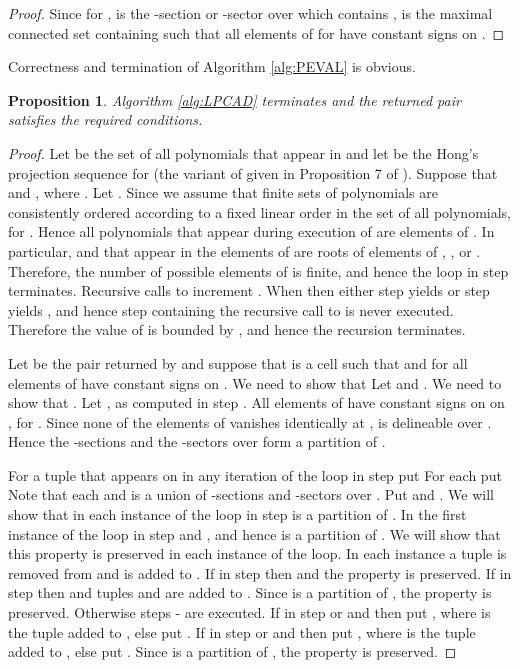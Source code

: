 \documentclass[english]{amsart}
\numberwithin{equation}{section}
\numberwithin{figure}{section}
\newtheorem{prop}[thm]{Proposition}
\begin{document}
\begin{proof}
Since for ,  is the -section or -sector
over  which contains ,  is the maximal
connected set containing  such that all elements of 
for  have constant signs on . 
\end{proof}
Correctness and termination of Algorithm \ref{alg:PEVAL} is obvious.
\begin{prop}
Algorithm \ref{alg:LPCAD} terminates and the returned pair 
satisfies the required conditions.\end{prop}
\begin{proof}
Let  be the set of all polynomials that appear in  and
let  be the Hong's projection sequence
\cite{H} for  (the variant of given in Proposition 7 of \cite{S9}).
Suppose that 
and , where . Let .
Since we assume that finite sets of polynomials are consistently ordered
according to a fixed linear order in the set of all polynomials, 
for . Hence all polynomials that appear during execution
of  are elements of . In particular,
 and  that appear in the elements of  are
roots of elements of , , or . Therefore,
the number of possible elements of  is finite, and hence the
loop in step  terminates. Recursive calls to  increment
. When  then either step  yields  or
step  yields , and hence step  containing the
recursive call to  is never executed. Therefore the value
of  is bounded by , and hence the recursion terminates.

Let  be the pair returned by  and suppose that 
is a cell such that  and for 
all elements of  have constant signs on . We
need to show that\emph{ }
Let  and .
We need to show that . Let ,
as computed in step . All elements of  have constant
signs on on , for . Since none of the
elements of  vanishes identically at ,  is
delineable over . Hence the -sections and the -sectors
over  form a partition of . 

For a tuple 
that appears on  in any iteration of the loop in step 
put
For each  put 
Note that each  and  is a union of
-sections and -sectors over . Put 
and . We will show
that in each instance of the loop in step  
is a partition of . In the first instance of the
loop in step   and ,
and hence  is a partition of .
We will show that this property is preserved in each instance of the
loop. In each instance a tuple 
is removed from  and  is added
to . If  in step  then 
and the property is preserved. If  in step  then
 and tuples 
and  are added to
. Since 
is a partition of , the property is preserved. Otherwise
steps - are executed. If in step  
or  and  then put ,
where  is the
tuple added to , else put . If in step
  or  and  then
put , where 
is the tuple added to , else put . Since
 is a partition of ,
the property is preserved. 


\end{proof}
\end{document}
